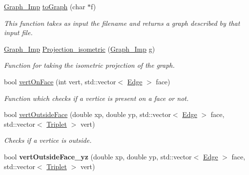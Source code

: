 \begin{DoxyCompactItemize}
\item 
\mbox{\hyperlink{class_graph___imp}{Graph\+\_\+\+Imp}} \mbox{\hyperlink{class_three___d__to___two___d_a21796ec5910d031e28c4eb3674528050}{to\+Graph}} (char $\ast$f)
\begin{DoxyCompactList}\small\item\em This function takes as input the filename and returns a graph described by that input file. \end{DoxyCompactList}\item 
\mbox{\hyperlink{class_graph___imp}{Graph\+\_\+\+Imp}} \mbox{\hyperlink{class_three___d__to___two___d_a4380f568564cfd30a96bb85bb55a8f55}{Projection\+\_\+isometric}} (\mbox{\hyperlink{class_graph___imp}{Graph\+\_\+\+Imp}} g)
\begin{DoxyCompactList}\small\item\em Function for taking the isometric projection of the graph. \end{DoxyCompactList}\item 
bool \mbox{\hyperlink{class_three___d__to___two___d_a0293e823fbe2396bece78195566ca4c3}{vert\+On\+Face}} (int vert, std\+::vector$<$ \mbox{\hyperlink{struct_edge}{Edge}} $>$ face)
\begin{DoxyCompactList}\small\item\em Function which checks if a vertice is present on a face or not. \end{DoxyCompactList}\item 
\mbox{\label{class_three___d__to___two___d_a34f0676b7cb1e9cacccd514ce07759cb}} 
bool \mbox{\hyperlink{class_three___d__to___two___d_a34f0676b7cb1e9cacccd514ce07759cb}{vert\+Outside\+Face}} (double xp, double yp, std\+::vector$<$ \mbox{\hyperlink{struct_edge}{Edge}} $>$ face, std\+::vector$<$ \mbox{\hyperlink{struct_triplet}{Triplet}} $>$ vert)
\begin{DoxyCompactList}\small\item\em Checks if a vertice is outside. \end{DoxyCompactList}\item 
\mbox{\label{class_three___d__to___two___d_a92c6de4cf2d59b884d8813aae1586e0a}} 
bool {\bfseries vert\+Outside\+Face\+\_\+yz} (double xp, double yp, std\+::vector$<$ \mbox{\hyperlink{struct_edge}{Edge}} $>$ face, std\+::vector$<$ \mbox{\hyperlink{struct_triplet}{Triplet}} $>$ vert)

\end{DoxyCompactItemize}

